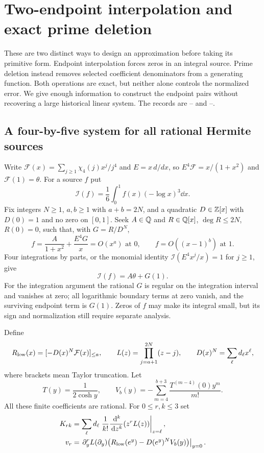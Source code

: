 \section{Two-endpoint interpolation and exact prime deletion}
\label{sec:endpoint-filter-case}

These are two distinct ways to design an approximation before taking
its primitive form. Endpoint interpolation forces zeros in an integral
source. Prime deletion instead removes selected coefficient denominators
from a generating function. Both operations are exact, but neither
alone controls the normalized error. We give enough information to
construct the endpoint pairs without recovering a large historical
linear system. The records are -- and
--.

\subsection{A four-by-five system for all rational Hermite sources}
Write $\mathcal F(x)=\sum_{j\geq1}\chi_4(j)x^j/j^4$ and $E=x\,d/dx$,
so $E^4\mathcal F=x/(1+x^2)$ and $\mathcal F(1)=\theta$.
For a source $f$ put
\[
 \mathcal I(f)=\frac16\int_0^1f(x)(-\log x)^3\dd x.
\]
Fix integers $N\geq1$, $a,b\geq1$ with $a+b=2N$, and a quadratic
$D\in\mathbb Z[x]$ with $D(0)=1$ and no zero on $[0,1]$.
Seek $A\in\mathbb Q$ and $R\in\mathbb Q[x]$, $\deg R\leq2N$, $R(0)=0$,
such that, with $G=R/D^N$,
\begin{equation}\label{eq:hermite-source}
 f=\frac{A}{1+x^2}+\frac{E^4G}{x}
       =O(x^a)\text{ at }0,\qquad f=O((x-1)^b)\text{ at }1.
\end{equation}
Four integrations by parts, or the monomial identity
$\mathcal I(E^4x^j/x)=1$ for $j\geq1$, give
\begin{equation}\label{eq:hermite-value}
 \mathcal I(f)=A\theta+G(1).
\end{equation}
For the integration argument the rational $G$ is regular on the
integration interval and vanishes at zero; all logarithmic boundary
terms at zero vanish, and the surviving endpoint term is $G(1)$.
Zeros of $f$ may make its integral small, but its sign and normalization
still require separate analysis.

Define
\[
 R_{\rm low}(x)=[-D(x)^N\mathcal F(x)]_{\leq a},\qquad
 L(z)=\prod_{j=a+1}^{2N}(z-j),\qquad D(x)^N=\sum_\ell d_\ell x^\ell,
\]
where brackets mean Taylor truncation. Let
\[
 T(y)=\frac1{2\cosh y},\qquad
 V_b(y)=-\sum_{m=4}^{b+3}\frac{T^{(m-4)}(0)y^m}{m!}.
\]
All these finite coefficients are rational. For $0\leq r,k\leq3$ set
\begin{align}
 K_{rk}&=\sum_\ell d_\ell
          \left.\frac1{k!}\frac{\,\mathrm d^k}{\,\mathrm d z^k}(z^rL(z))\right|_{z=\ell},
 \label{eq:hermite-K}\\
 v_r&=\left.\partial_y^rL(\partial_y)
           \bigl(R_{\rm low}(e^y)-D(e^y)^NV_b(y)\bigr)\right|_{y=0}.
 \label{eq:hermite-v}
\end{align}

